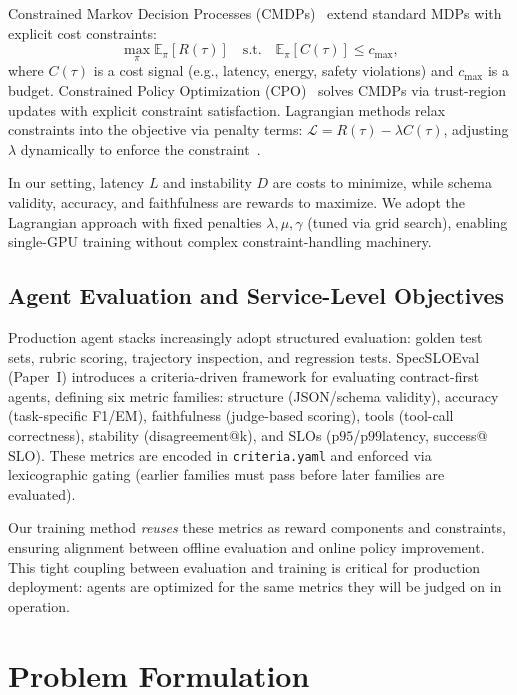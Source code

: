 \documentclass[11pt]{article}
\newcommand{\pninetyfive}{\ensuremath{\mathrm{p95}}}
\newcommand{\pninetynine}{\ensuremath{\mathrm{p99}}}
\newcommand{\slo}{\ensuremath{\mathrm{SLO}}}
\begin{document}
Constrained Markov Decision Processes (CMDPs)~\citep{altman1999cmdp} extend standard MDPs with explicit cost constraints:
\begin{equation}
\max_{\pi} \mathbb{E}_{\pi} [R(\tau)] \quad \text{s.t.} \quad \mathbb{E}_{\pi} [C(\tau)] \leq c_{\max},
\end{equation}
where $C(\tau)$ is a cost signal (e.g., latency, energy, safety violations) and $c_{\max}$ is a budget.
Constrained Policy Optimization (CPO)~\citep{achiam2017cpo} solves CMDPs via trust-region updates with explicit constraint satisfaction.
Lagrangian methods relax constraints into the objective via penalty terms: $\mathcal{L} = R(\tau) - \lambda C(\tau)$, adjusting $\lambda$ dynamically to enforce the constraint~\citep{ray2019benchmarking}.

In our setting, latency $L$ and instability $D$ are costs to minimize, while schema validity, accuracy, and faithfulness are rewards to maximize.
We adopt the Lagrangian approach with fixed penalties $\lambda, \mu, \gamma$ (tuned via grid search), enabling single-GPU training without complex constraint-handling machinery.

\subsection{Agent Evaluation and Service-Level Objectives}

Production agent stacks increasingly adopt structured evaluation: golden test sets, rubric scoring, trajectory inspection, and regression tests.
SpecSLOEval (Paper~I) introduces a criteria-driven framework for evaluating contract-first agents, defining six metric families: structure (JSON/schema validity), accuracy (task-specific F1/EM), faithfulness (judge-based scoring), tools (tool-call correctness), stability (disagreement@k), and \slo s (\pninetyfive/\pninetynine latency, success@\slo).
These metrics are encoded in \texttt{criteria.yaml} and enforced via lexicographic gating (earlier families must pass before later families are evaluated).

Our training method \emph{reuses} these metrics as reward components and constraints, ensuring alignment between offline evaluation and online policy improvement.
This tight coupling between evaluation and training is critical for production deployment: agents are optimized for the same metrics they will be judged on in operation.

\section{Problem Formulation}
\label{sec:problem}
\end{document}
